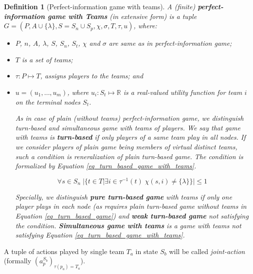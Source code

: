 \newtheorem*{defpigt}{Definition}
\begin{defpigt}[Perfect-information game with teams]

A (finite) \textbf{perfect-information game with Teams} (in extensive form) is a tuple $G =
(P,A\cup\{\lambda\}, S=S_n\cup S_p, \chi, \sigma, T, \tau, u)$, where:


\begin{itemize}

\item $P$, $n$, $A$, $\lambda$, $S$, $S_n$, $S_t$, $\chi$ and $\sigma$ are same as in
perfect-information game;

\item $T$ is a set of teams;

\item $\tau: P \mapsto T$, assigns players to the teams; and

\item $u = (u_1,\ldots,u_m)$, where $u_i: S_t \mapsto \mathbb{R}$ is a real-valued utility
function for team $i$ on the terminal nodes $S_t$.

As in case of plain (without teams) perfect-information game, we distinguish turn-based and 
simultaneous game with teams of players. We say that game with teams is \textbf{turn-based} 
if only players of a same team play in all nodes. If we consider players of plain game being
members of virtual distinct teams, such a condition is reneralization of plain turn-based game.
The condition is formalized by Equation \ref{eq_turn_based_game_with_teams}.

\begin{equation}
\label{eq_turn_based_game_with_teams}
\forall s \in S_n \; |\{t \in T|\exists i \in \tau^{-1}(t)\;\chi(s,i) \not= \{\lambda\}\}| \le 1
\end{equation}

Specially, we distinguish 
\textbf{pure turn-based game} with teams if only one player plays in each node (as requires
plain turn-based game without teams in Equation \ref{eq_turn_based_game}) and 
\textbf{weak turn-based game} not satisfying the condition. \textbf{Simultaneous game with
teams} is a game with teams not satisfying Equation \ref{eq_turn_based_game_with_teams}.


\end{itemize}

\end{defpigt}

A tuple of actions played by single team $T_a$ in state $S_b$ will be called \emph{joint-action} (formally
$(a_p^{S_b})_{\tau(p_a)=T_a}$).


